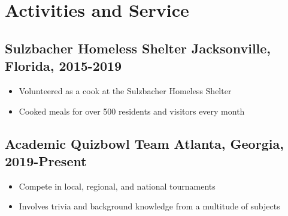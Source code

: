 \documentclass[12pt, noindent]{article}
\begin{document}
\section{Activities and Service}
\subsection{Sulzbacher Homeless Shelter \hfill \normalsize \normalfont
  Jacksonville, Florida, 2015-2019}
\begin{itemize}
  \itemsep-.25em
\item Volunteered as a cook at the Sulzbacher Homeless Shelter
\item Cooked meals for over 500 residents and visitors every month
\end{itemize}
\subsection{Academic Quizbowl Team \hfill \normalsize \normalfont Atlanta,
  Georgia, 2019-Present}
\begin{itemize}
  \itemsep-.25em
\item Compete in local, regional, and national tournaments
\item Involves trivia and background knowledge from a multitude of subjects
\end{itemize}
\end{document}

